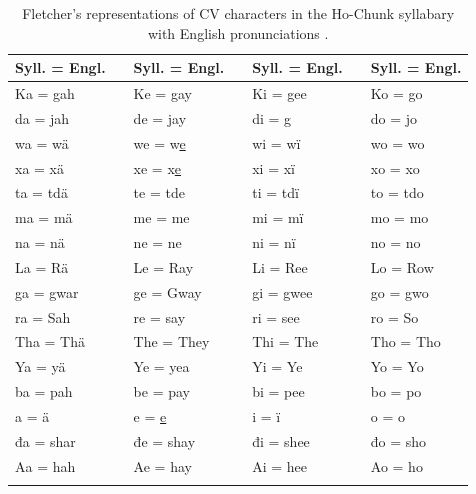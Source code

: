 \documentclass[output=paper]{LSP/langsci}
\begin{document}
\begin{table}
\begin{tabular}{lllllll}
\lsptoprule
Syll. = Engl. && Syll. = Engl. && Syll. = Engl. && Syll. = Engl.\\
\midrule
Ka = gah && Ke = gay && Ki = gee && Ko = go\\
da = jah && de = jay && di = g && do = jo\\
wa = wä && we = w\underline{e} && wi = wï && wo = wo\\
xa = xä && xe = x\underline{e} && xi = xï && xo = xo\\
ta = tdä && te = tde && ti = tdï && to = tdo\\
ma = mä && me = me && mi = mï && mo = mo\\
na = nä && ne = ne && ni = nï && no = no\\
La = Rä && Le = Ray && Li = Ree && Lo = Row\\
ga = gwar && ge = Gway && gi = gwee && go = gwo\\
ra = Sah && re = say && ri = see && ro = So\\
Tha = Thä && The = They && Thi = The && Tho = Tho\\
Ya = yä && Ye = yea && Yi = Ye && Yo = Yo\\
ba = pah && be = pay && bi = pee && bo = po\\
a = ä && e = \underline{e} && i = ï && o = o\\
đa = shar && đe = shay && đi = shee && đo = sho\\
Aa = hah && Ae = hay && Ai = hee && Ao = ho\\
\lspbottomrule
\end{tabular}
\caption{Fletcher's representations of CV characters in the Ho-Chunk syllabary with English pronunciations \citep[adapted from][300]{Fletcher1890a}.}
\label{fletchercv}
\end{table}
\end{document}
